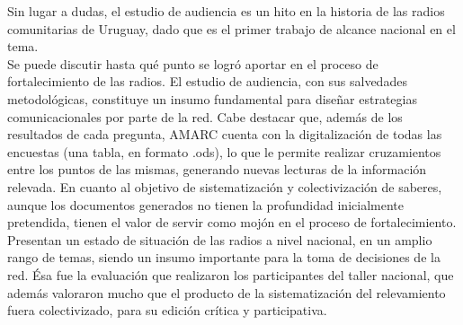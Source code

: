 Sin lugar a dudas, el estudio de audiencia es un hito en la historia de las radios comunitarias de Uruguay, dado que es el primer trabajo de alcance nacional en el tema.\\

Se puede discutir hasta qué punto se logró aportar en el proceso de fortalecimiento de las radios. El estudio de audiencia, con sus salvedades metodológicas, constituye un insumo fundamental para diseñar estrategias comunicacionales por parte de la red. Cabe destacar que, además de los resultados de cada pregunta, AMARC cuenta con la digitalización de todas las encuestas (una tabla, en formato .ods), lo que le permite realizar cruzamientos entre los puntos de las mismas, generando nuevas lecturas de la información relevada. En cuanto al objetivo de sistematización y colectivización de saberes, aunque los documentos generados no tienen la profundidad inicialmente pretendida, tienen el valor de servir como mojón en el proceso de fortalecimiento. Presentan un estado de situación de las radios a nivel nacional, en un amplio rango de temas, siendo un insumo importante para la toma de decisiones de la red. Ésa fue la evaluación que realizaron los participantes del taller nacional, que además valoraron mucho que el producto de la sistematización del relevamiento fuera colectivizado, para su edición crítica y participativa.
